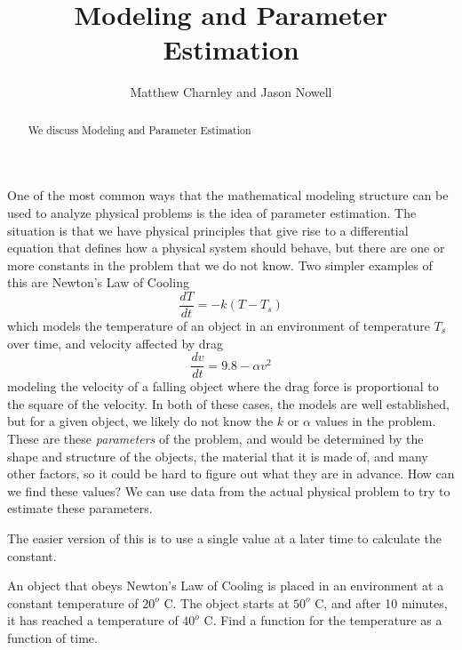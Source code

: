 \documentclass{ximera}
\title{Modeling and Parameter Estimation}
\author{Matthew Charnley and Jason Nowell}
\begin{document}
\begin{abstract}
    We discuss Modeling and Parameter Estimation
\end{abstract}
\maketitle

\label{modelfirstestim:section}


One of the most common ways that the mathematical modeling structure can be used to analyze physical problems is the idea of parameter estimation. The situation is that we have physical principles that give rise to a differential equation that defines how a physical system should behave, but there are one or more constants in the problem that we do not know. Two simpler examples of this are Newton's Law of Cooling 
\begin{equation*}
    \frac{dT}{dt} = -k(T - T_s)
\end{equation*}
which models the temperature of an object in an environment of temperature $T_s$ over time, and velocity affected by drag
\begin{equation*}
    \frac{dv}{dt} = 9.8 - \alpha v^2
\end{equation*}
modeling the velocity of a falling object where the drag force is proportional to the square of the velocity. In both of these cases, the models are well established, but for a given object, we likely do not know the $k$ or $\alpha$ values in the problem. These are these \emph{parameters} of the problem, and would be determined by the shape and structure of the objects, the material that it is made of, and many other factors, so it could be hard to figure out what they are in advance. How can we find these values? We can use data from the actual physical problem to try to estimate these parameters.

The easier version of this is to use a single value at a later time to calculate the constant.

\begin{example} 
    An object that obeys Newton's Law of Cooling is placed in an environment at a constant temperature of $20^o$ C. The object starts at $50^o$ C, and after 10 minutes, it has reached a temperature of $40^o$ C. Find a function for the temperature as a function of time.
\end{example}
\end{document}
